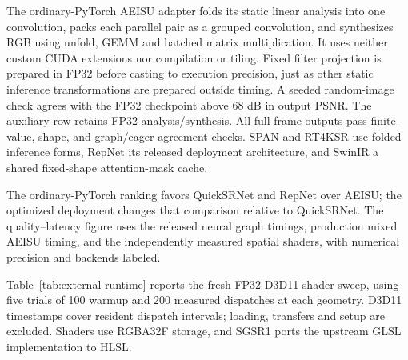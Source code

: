 \documentclass[10pt,twocolumn,letterpaper]{article}
\newcommand{\model}{AEISU}
\begin{document}
The ordinary-PyTorch \model{} adapter folds its static linear analysis into one convolution, packs each parallel pair as a grouped convolution, and synthesizes RGB using unfold, GEMM and batched matrix multiplication.
It uses neither custom CUDA extensions nor compilation or tiling.
Fixed filter projection is prepared in FP32 before casting to execution precision, just as other static inference transformations are prepared outside timing.
A seeded random-image check agrees with the FP32 checkpoint above 68 dB in output PSNR.
The auxiliary row retains FP32 analysis/synthesis.
All full-frame outputs pass finite-value, shape, and graph/eager agreement checks.
SPAN and RT4KSR use folded inference forms, RepNet its released deployment architecture, and SwinIR a shared fixed-shape attention-mask cache.

The ordinary-PyTorch ranking favors QuickSRNet and RepNet over \model{}; the optimized deployment changes that comparison relative to QuickSRNet.
The quality--latency figure uses the released neural graph timings, production mixed \model{} timing, and the independently measured spatial shaders, with numerical precision and backends labeled.

Table~\ref{tab:external-runtime} reports the fresh FP32 D3D11 shader sweep, using five trials of 100 warmup and 200 measured dispatches at each geometry.
D3D11 timestamps cover resident dispatch intervals; loading, transfers and setup are excluded.
Shaders use RGBA32F storage, and SGSR1 ports the upstream GLSL implementation to HLSL.


\end{document}
